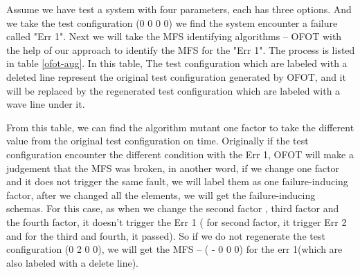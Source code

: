 \documentclass{sig-alternate}
\begin{document}
Assume we have test a system with four parameters, each has three options. And we take the test configuration (0 0 0 0) we find the system encounter a failure called "Err 1". Next we will take the MFS identifying algorithms -- OFOT with the help of our approach to identify the MFS for the "Err 1". The process is listed in table \ref{ofot-aug}. In this table, The test configuration which are labeled with a deleted line represent the original test configuration generated by OFOT, and it will be replaced by the regenerated test configuration which are labeled with a wave line under it.

From this table, we can find the algorithm mutant one factor to take the different value from the original test configuration on time. Originally if the test configuration encounter the different condition with the Err 1, OFOT will make a judgement that the MFS was broken, in another word, if we change one factor and it does not trigger the same fault, we will label them as one failure-inducing factor, after we changed all the elements, we will get the failure-inducing schemas. For this case, as when we change the second factor , third factor and the fourth factor, it doesn't trigger the Err 1 ( for second factor, it trigger Err 2 and for the third and fourth, it passed). So if we do not regenerate the test configuration (0 2 0 0), we will get the MFS -- ( - 0 0 0) for the err 1(which are also labeled with a delete line).
\end{document}
